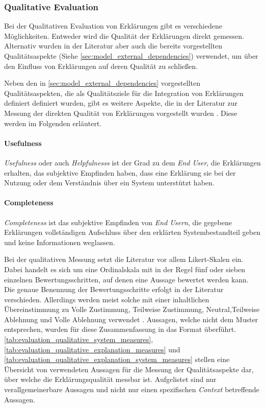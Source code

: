 \subsubsection{Qualitative Evaluation}

Bei der Qualitativen Evaluation von Erklärungen gibt es verschiedene Möglichkeiten. Entweder wird die Qualität der Erklärungen direkt gemessen. Alternativ wurden in der Literatur aber auch die bereits vorgestellten Qualitätsaspekte (Siehe \autoref{sec:model_external_dependencies}) verwendet, um über den Einfluss von Erklärungen auf deren Qualität zu schließen.

Neben den in \autoref{sec:model_external_dependencies} vorgestellten Qualitätsaspekten, die als Qualitätsziele für die Integration von Erklärungen definiert definiert wurden, gibt es weitere Aspekte, die in der Literatur zur Messung der direkten Qualität von Erklärungen vorgestellt wurden \cite{sato_action-triggering_2019}. Diese werden im Folgenden erläutert.

\paragraph{Usefulness} \textit{Usefulness} oder auch \textit{Helpfulnesss} ist der Grad zu dem \textit{End User}, die Erklärungen erhalten, das subjektive Empfinden haben, dass eine Erklärung sie bei der Nutzung oder dem Verständnis über ein System unterstützt haben. 

\paragraph{Completeness} \textit{Completeness} ist das subjektive Empfinden von \textit{End Usern}, die gegebene Erklärungen vollständigen Aufschluss über den erklärten Systembestandteil geben und keine Informationen weglassen.

\bigskip

Bei der qualitativen Messung setzt die Literatur vor allem Likert-Skalen ein. Dabei handelt es sich um eine Ordinalskala mit in der Regel fünf oder sieben einzelnen Bewertungsschritten, auf denen eine Aussage bewertet werden kann. Die genaue Benennung der Bewertungsschritte erfolgt in der Literatur verschieden. Allerdings werden meist solche mit einer inhaltlichen Übereinstimmung zu \glqq Volle Zustimmung\grqq{}, \glqq Teilweise Zustimmung\grqq{}, \glqq Neutral\grqq{},\glqq Teilweise Ablehnung\grqq{} und \glqq Volle Ablehnung\grqq{} verwendet \cite{sato_action-triggering_2019, sato_context_nodate, wang_is_2018, hoffman_metrics_nodate, koo_understanding_2016, koo_why_2015}. Aussagen, welche nicht dem Muster entsprechen, wurden für diese Zusammenfassung in das Format überführt. \autoref{tab:evaluation_qualitative_system_measures}, \autoref{tab:evaluation_qualitative_explanation_measures} und \autoref{tab:evaluation_qualitative_explanation_system_measures} stellen eine Übersicht von verwendeten Aussagen für die Messung der Qualitätsaspekte dar, über welche die Erklärungsqualität messbar ist. Aufgelistet sind nur verallgemeinerbare Aussagen und nicht nur einen spezifischen \textit{Context} betreffende Aussagen.

